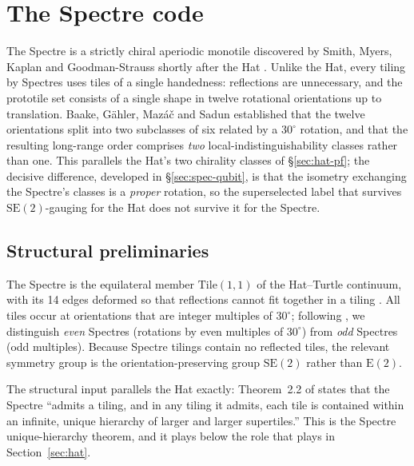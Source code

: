 \documentclass[a4paper,unpublished]{quantumarticle}
\theoremstyle{remark}
\newcommand{\Etwo}{\mathrm{E}(2)}
\newcommand{\SEtwo}{\mathrm{SE}(2)}
\begin{document}
\section{The Spectre code}
\label{sec:spectre}

The Spectre is a strictly chiral aperiodic monotile discovered by
Smith, Myers, Kaplan and Goodman-Strauss shortly after the Hat
\cite{Smith2024spectre}. Unlike the Hat, every tiling by Spectres
uses tiles of a single handedness: reflections are unnecessary, and
the prototile set consists of a single shape in twelve rotational
orientations up to translation. Baake, G\"ahler, Maz\'a\v{c} and
Sadun \cite{BGMS2025} established that the twelve orientations split
into two subclasses of six related by a $30^{\circ}$ rotation, and
that the resulting long-range order comprises \emph{two}
local-indistinguishability classes rather than one. This parallels
the Hat's two chirality classes of \S\ref{sec:hat-pf}; the decisive
difference, developed in \S\ref{sec:spec-qubit}, is that the
isometry exchanging the Spectre's classes is a \emph{proper}
rotation, so the superselected label that survives $\SEtwo$-gauging
for the Hat does not survive it for the Spectre.

\subsection{Structural preliminaries}
\label{sec:spec-struct}

The Spectre is the equilateral member $\mathrm{Tile}(1,1)$ of the
Hat--Turtle continuum, with its 14 edges deformed so that reflections
cannot fit together in a tiling \cite{Smith2024spectre}. All tiles
occur at orientations that are integer multiples of $30^{\circ}$;
following \cite{Smith2024spectre}, we distinguish \emph{even}
Spectres (rotations by even multiples of $30^{\circ}$) from
\emph{odd} Spectres (odd multiples). Because Spectre tilings contain
no reflected tiles, the relevant symmetry group is the
orientation-preserving group $\SEtwo$ rather than $\Etwo$.

The structural input parallels the Hat exactly:
Theorem~2.2 of \cite{Smith2024spectre} states that the Spectre
``admits a tiling, and in any tiling it admits, each tile is
contained within an infinite, unique hierarchy of larger and larger
supertiles.'' This is the Spectre unique-hierarchy theorem, and it
plays below the role that \cite[\S 5]{Smith2024hat} plays in
Section~\ref{sec:hat}.
\end{document}
